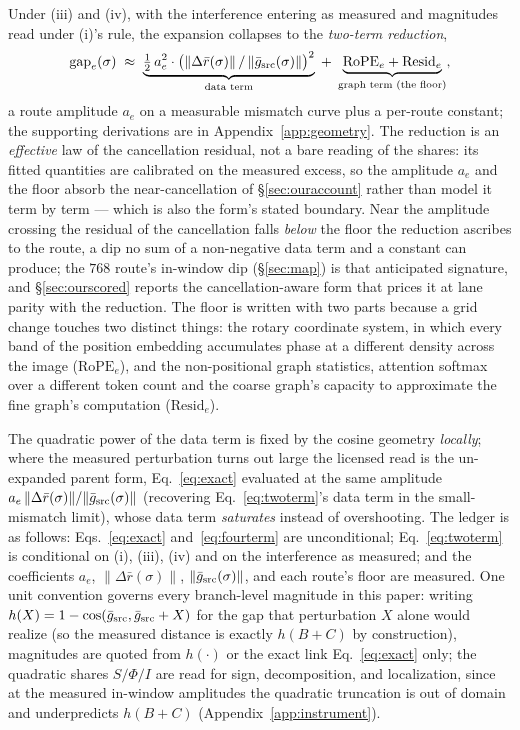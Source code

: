 Under (iii) and (iv), with the interference entering as
measured and magnitudes read under (i)'s rule, the expansion
collapses to the \emph{two-term reduction},
\begin{equation}
\mathrm{gap}_e(\sigma)
\;\approx\;
\underbrace{\tfrac{1}{2}\,a_e^2 \cdot \big(\|\Delta \bar r(\sigma)\| \,/\, \|\bar g_{\mathrm{src}}(\sigma)\|\big)^{2}}_{\text{data term}}
\;+\; \underbrace{\mathrm{RoPE}_e + \mathrm{Resid}_e}_{\text{graph term (the floor)}},
\label{eq:twoterm}
\end{equation}
a route amplitude $a_e$ on a measurable mismatch curve plus a
per-route constant; the supporting derivations are in
Appendix~\ref{app:geometry}. The reduction is an \emph{effective} law
of the cancellation residual, not a bare reading of the shares: its
fitted quantities are calibrated on the measured excess, so the
amplitude $a_e$ and the floor absorb the near-cancellation of
\S\ref{sec:ouraccount} rather than model it term by term --- which is
also the form's stated boundary. Near the amplitude crossing the
residual of the cancellation falls \emph{below} the floor the
reduction ascribes to the route, a dip no sum of a non-negative data
term and a constant can produce; the $768$ route's in-window dip
(\S\ref{sec:map}) is that anticipated signature, and
\S\ref{sec:ourscored} reports the cancellation-aware form that prices
it at lane parity with the reduction. The floor is written with two parts
because a grid change touches two distinct things: the rotary
coordinate system, in which every band of the position embedding
accumulates phase at a different density across the image
($\mathrm{RoPE}_e$), and the non-positional graph statistics,
attention softmax over a different token count and the coarse graph's
capacity to approximate the fine graph's computation
($\mathrm{Resid}_e$).

The quadratic
power of the data term is fixed by the cosine geometry \emph{locally};
where the measured perturbation turns out large the licensed read is the
un-expanded parent form, Eq.~\ref{eq:exact} evaluated at the same
amplitude $a_e\,\|\Delta \bar r(\sigma)\|/\|\bar g_{\mathrm{src}}(\sigma)\|$
(recovering Eq.~\ref{eq:twoterm}'s data term in the small-mismatch
limit), whose data term
\emph{saturates} instead of overshooting.
The ledger is as follows: Eqs.~\ref{eq:exact} and~\ref{eq:fourterm}
are unconditional; Eq.~\ref{eq:twoterm} is conditional on
(i), (iii), (iv) and on the interference as measured; and the
coefficients $a_e$, $\|\Delta \bar r(\sigma)\|$,
$\|\bar g_{\mathrm{src}}(\sigma)\|$, and each route's floor are measured.
One unit convention governs every branch-level magnitude in this
paper: writing $h(X) = 1 - \cos(\bar g_{\mathrm{src}}, \bar g_{\mathrm{src}} + X)$
for the gap that perturbation $X$ alone would realize (so the
measured distance is exactly $h(B{+}C)$ by construction), magnitudes
are quoted from $h(\cdot)$ or the exact link Eq.~\ref{eq:exact} only;
the quadratic shares $S/\Phi/I$ are read for sign, decomposition, and
localization, since at the measured in-window amplitudes the
quadratic truncation is out of domain and underpredicts $h(B{+}C)$
(Appendix~\ref{app:instrument}).

